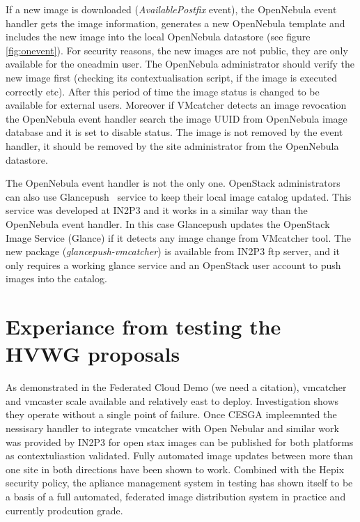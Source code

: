 \documentclass{llncs_Ibergrid2013}
\begin{document}
If a new image is downloaded (\textit{AvailablePostfix} event), the OpenNebula event handler gets the image information, generates a new OpenNebula template and includes the new image into the local OpenNebula datastore (see figure \ref{fig:onevent}). 
For security reasons, the new images are not public, they are only available for the oneadmin user. The OpenNebula administrator should verify the new image first (checking its contextualisation script, if the image is executed correctly etc).
After this period of time the image status is changed to be available for external users. 
Moreover if VMcatcher detects an image revocation the OpenNebula event handler search the image UUID from OpenNebula image database and it is set to disable status.
The image is not removed by the event handler, it should be removed by the site administrator from the OpenNebula datastore.

The OpenNebula event handler is not the only one. OpenStack administrators can also use Glancepush~\cite{glancepush} service to keep their local image catalog updated. 
This service was developed at IN2P3 and it works in a similar way than the OpenNebula event handler. 
In this case Glancepush updates the OpenStack Image Service (Glance) if it detects any image change from VMcatcher tool. 
The new package (\textit{glancepush-vmcatcher}) is available from IN2P3 ftp server, and it only requires a working glance service and an OpenStack user account to push images into the catalog.



\section{Experiance from testing the HVWG proposals}
\label{sect-experiances}
As demonstrated in the Federated Cloud Demo (we need a citation), vmcatcher and vmcaster scale available and relatively east to deploy. Investigation shows they operate without a single point of failure. Once CESGA impleemnted the nessisary handler to integrate vmcatcher with Open Nebular and similar work was provided by IN2P3 for open stax images can be published for both platforms as contextuliastion validated. Fully automated image updates between more than one site in both directions have been shown to work. Combined with the Hepix security policy, the apliance management system in testing has shown itself to be a basis of a full automated, federated image distribution system in practice and currently prodcution grade.
\end{document}
